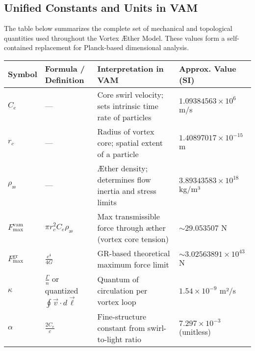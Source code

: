 \subsection*{Unified Constants and Units in VAM}

The table below summarizes the complete set of mechanical and topological quantities used throughout the Vortex Æther Model. These values form a self-contained replacement for Planck-based dimensional analysis.


\begin{table}[H]
    \centering
    \footnotesize
    \renewcommand{\arraystretch}{1.3}
    \begin{tabular}{|l|l|l|l|}
        \hline
        \textbf{Symbol} & \textbf{Formula / Definition} & \textbf{Interpretation in VAM} & \textbf{Approx. Value (SI)} \\
        \hline

        $C_e$ &
        — &
        Core swirl velocity; sets intrinsic time rate of particles &
        $1.09384563 \times 10^6$ m/s \\
        \hline

        $r_c$ &
        — &
        Radius of vortex core; spatial extent of a particle &
        $1.40897017 \times 10^{-15}$ m \\
        \hline

        $\rho_\text{\ae}$ &
        — &
        Æther density; determines flow inertia and stress limits &
        $3.89343583 \times 10^{18}$ kg/m³ \\
        \hline

        $F^{\text{vam}}_\text{max}$ &
        $\pi r_c^2 C_e \rho_\text{\ae}$ &
        Max transmissible force through æther (vortex core tension) &
        $\sim 29.053507$ N \\
        \hline

        $F^{\text{gr}}_\text{max}$ &
        $\frac{c^4}{4G}$ &
        GR-based theoretical maximum force limit &
        $\sim 3.02563891 \times 10^{43}$ N \\
        \hline

        $\kappa$ &
        $\frac{\Gamma}{n}$ or quantized $\oint \vec{v} \cdot d\vec{\ell}$ &
        Quantum of circulation per vortex loop &
        $1.54 \times 10^{-9}$ m²/s \\
        \hline

        $\alpha$ &
        $\frac{2 C_e}{c}$ &
        Fine-structure constant from swirl-to-light ratio &
        $7.297 \times 10^{-3}$ (unitless) \\
        \hline


\end{tabular}
\end{table}
